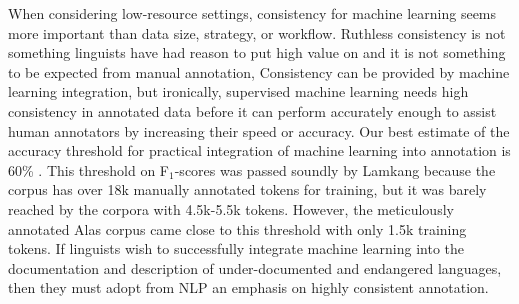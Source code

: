 When considering low-resource settings, consistency for machine learning seems more important than data size, strategy, or workflow. Ruthless consistency is not something linguists have had reason to put high value on and it is not something to be expected from manual annotation, %
Consistency can be provided by machine learning integration, but ironically, supervised machine learning needs high consistency in annotated data before it can perform accurately enough to assist human annotators by increasing their speed or accuracy. Our best estimate of the accuracy threshold for practical integration of machine learning into annotation is 60\% \citep{felt_improving_2012}. This threshold on F$_1$-scores was passed soundly by Lamkang because the corpus has over 18k manually annotated tokens for training, but it was barely reached by the corpora with 4.5k-5.5k tokens. However, the meticulously annotated Alas corpus came close to this threshold with only 1.5k training tokens. If linguists wish to successfully integrate machine learning into the documentation and description of under-documented and endangered languages, then they must adopt from NLP an emphasis on highly consistent annotation.



